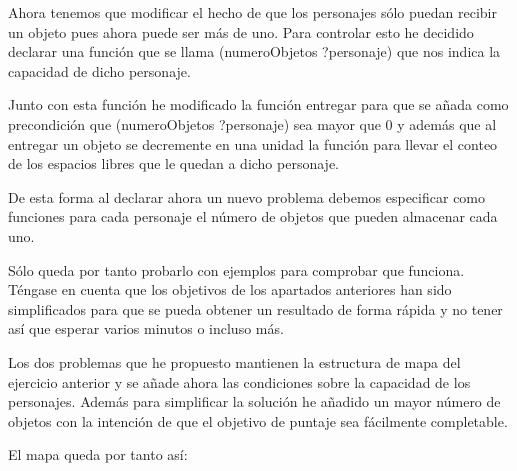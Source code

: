 \documentclass[12pt,a4paper]{article}
\begin{document}
Ahora tenemos que modificar el hecho de que los personajes sólo puedan recibir un objeto pues ahora puede ser más de uno. Para controlar esto he decidido declarar una función que se llama (numeroObjetos ?personaje) que nos indica la capacidad de dicho personaje.

Junto con esta función he modificado la función entregar para que se añada como precondición que (numeroObjetos ?personaje) sea mayor que 0 y además que al entregar un objeto se decremente en una unidad la función para llevar el conteo de los espacios libres que le quedan a dicho personaje.

De esta forma al declarar ahora un nuevo problema debemos especificar como funciones para cada personaje el número de objetos que pueden almacenar cada uno.

Sólo queda por tanto probarlo con ejemplos para comprobar que funciona. Téngase en cuenta que los objetivos de los apartados anteriores han sido simplificados para que se pueda obtener un resultado de forma rápida y no tener así que esperar varios minutos o incluso más.

Los dos problemas que he propuesto mantienen la estructura de mapa del ejercicio anterior y se añade ahora las condiciones sobre la capacidad de los personajes. Además para simplificar la solución he añadido un mayor número de objetos con la intención de que el objetivo de puntaje sea fácilmente completable.

El mapa queda por tanto así:

\end{document}
